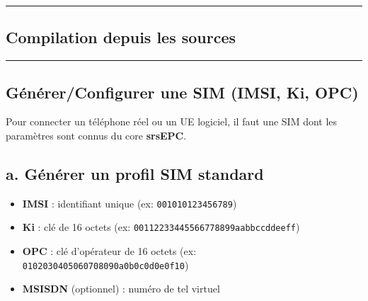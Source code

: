 \documentclass[
  french,
]{article}
\newenvironment{Shaded}{\begin{snugshade}}{\end{snugshade}}
\newcommand{\AttributeTok}[1]{\textcolor[rgb]{0.13,0.29,0.53}{#1}}
\newcommand{\BuiltInTok}[1]{#1}
\newcommand{\DataTypeTok}[1]{\textcolor[rgb]{0.13,0.29,0.53}{#1}}
\newcommand{\FunctionTok}[1]{\textcolor[rgb]{0.13,0.29,0.53}{\textbf{#1}}}
\newcommand{\KeywordTok}[1]{\textcolor[rgb]{0.13,0.29,0.53}{\textbf{#1}}}
\newcommand{\NormalTok}[1]{#1}
\newcommand{\VariableTok}[1]{\textcolor[rgb]{0.00,0.00,0.00}{#1}}
\providecommand{\tightlist}{%
  \setlength{\itemsep}{0pt}\setlength{\parskip}{0pt}}
\begin{document}
\begin{center}\rule{0.5\linewidth}{0.5pt}\end{center}

\subsection{Compilation depuis les
sources}\label{compilation-depuis-les-sources}

\begin{Shaded}
\end{Shaded}

\begin{center}\rule{0.5\linewidth}{0.5pt}\end{center}

\subsection{Générer/Configurer une SIM (IMSI, Ki,
OPC)}\label{guxe9nuxe9rerconfigurer-une-sim-imsi-ki-opc}

Pour connecter un téléphone réel ou un UE logiciel, il faut une SIM dont
les paramètres sont connus du core \textbf{srsEPC}.

\subsection{a. Générer un profil SIM
standard}\label{a.-guxe9nuxe9rer-un-profil-sim-standard}

\begin{itemize}
\tightlist
\item
  \textbf{IMSI} : identifiant unique (ex: \texttt{001010123456789})
\item
  \textbf{Ki} : clé de 16 octets (ex:
  \texttt{00112233445566778899aabbccddeeff})
\item
  \textbf{OPC} : clé d'opérateur de 16 octets (ex:
  \texttt{0102030405060708090a0b0c0d0e0f10})
\item
  \textbf{MSISDN} (optionnel) : numéro de tel virtuel
\end{itemize}
\end{document}
